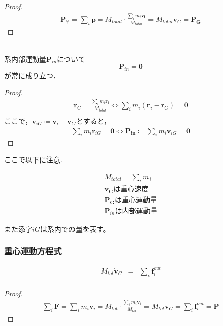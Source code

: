 \documentclass[dvipdfmx,uplatex]{jsarticle}
\begin{document}
\begin{proof}
  \begin{align*}
    \bm{P}_{\forall} = \sum_i \bm{p} = M_{total} \cdot \frac{\sum\limits_i m_i \bm{v_i}}{M_{total}} = M_{total} \bm{v}_G = \bm{P_G}
  \end{align*}
\end{proof}

\begin{theo}\mbox{}\\
  系内部運動量$\bm{P}_{in}$について
  \begin{equation*}
    \bm{P}_{in} = \bm{0}
  \end{equation*}
  が常に成り立つ．
\end{theo}

\begin{proof}
  \begin{align*}
    \bm{r}_G = \frac{\sum\limits_i m_i \bm{r_i}}{M_{total}} \iff \sum_i m_i (\bm{r}_i - \bm{r}_G) = \bm{0}\\
  \end{align*}
  ここで，$\bm{v}_{iG} \coloneqq \bm{v}_i - \bm{v}_G$とすると，
  \begin{align*}
    \sum_i m_i \bm{r}_{iG} = \bm{0} \iff \bm{P_{in}} \coloneqq \sum_i m_i \bm{v}_{iG} = \bm{0}
  \end{align*}
\end{proof}

ここで以下に注意.

\begin{eqnarray*}
  M_{total} = \sum_i m_i \\
  \bm{v_G} は重心速度 \\
  \bm{P_G} は重心運動量 \\
  \bm{P}_{in}　は内部運動量
\end{eqnarray*}

また添字$iG$は系内での量を表す。

\subsubsection{重心運動方程式}
\begin{theo}
  \begin{eqnarray*}
    M_{tot} \dot{\bm{v}}_G &=& \sum_i \bm{f}^{out}_i \\
  \end{eqnarray*}
\end{theo}

\begin{proof}
  \begin{align*}
    \sum_i \bm{F} = \sum_i m_i \bm{v}_i
    = M_{tot} \cdot \frac{\sum\limits_i m_i \bm{v}_i}{M_{tot}}
    = M_{tot} \dot{\bm{v}}_G = \sum_i \bm{f}_i^{out} = \dot{\bm{P}}
  \end{align*}
\end{proof}
\end{document}
